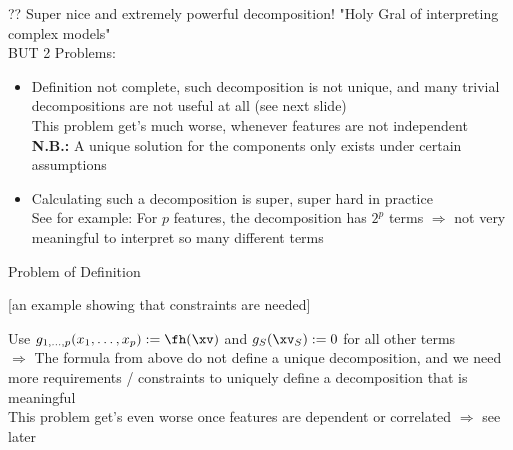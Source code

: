 \documentclass[11pt,compress,t,notes=noshow, aspectratio=169, xcolor=table]{beamer}
\begin{document}
\begin{frame}{??}
    Super nice and extremely powerful decomposition! "Holy Gral of interpreting complex models"\\
    BUT 2 Problems:
    \begin{itemize}
        \item Definition not complete, such decomposition is not unique, and many trivial decompositions are not useful at all (see next slide) \\
            This problem get's much worse, whenever features are not independent \\
        \textbf{N.B.:} %
        A unique solution for the components only exists under certain assumptions
        \item Calculating such a decomposition is super, super hard in practice \\
            See for example: For \(p\) features, the decomposition has \(2^p\) terms \(\Rightarrow\) not very meaningful to interpret so many different terms \\
    \end{itemize}
\end{frame}

\begin{frame}{Problem of Definition}

    [an example showing that constraints are needed]

    Use $g_{1, \dots, p}(x_1, \dots, x_p) := \fh(\xv)$ and $g_S(\xv_S) := 0$ for all other terms
    \\
    \(\Rightarrow\) The formula from above do not define a unique decomposition, and we need more requirements / constraints to uniquely define a decomposition that is meaningful
    \\
    This problem get's even worse once features are dependent or correlated \(\Rightarrow\) see later
    
\end{frame}
\end{document}
